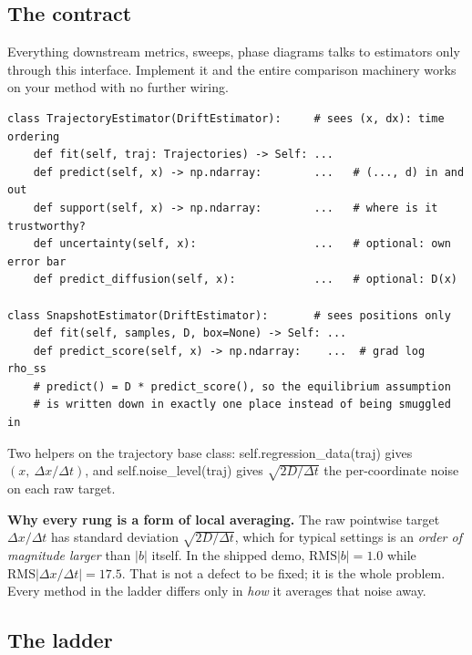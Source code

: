 \documentclass[11pt,a4paper]{article}
\newcommand{\code}[1]{{\ttfamily\small #1}}
\begin{document}
\subsection{The contract}

Everything downstream \textemdash{} metrics, sweeps, phase diagrams \textemdash{} talks
to estimators only through this interface. Implement it and the entire comparison
machinery works on your method with no further wiring.

\begin{codebox}
\begin{lstlisting}
class TrajectoryEstimator(DriftEstimator):     # sees (x, dx): time ordering
    def fit(self, traj: Trajectories) -> Self: ...
    def predict(self, x) -> np.ndarray:        ...   # (..., d) in and out
    def support(self, x) -> np.ndarray:        ...   # where is it trustworthy?
    def uncertainty(self, x):                  ...   # optional: own error bar
    def predict_diffusion(self, x):            ...   # optional: D(x)

class SnapshotEstimator(DriftEstimator):       # sees positions only
    def fit(self, samples, D, box=None) -> Self: ...
    def predict_score(self, x) -> np.ndarray:    ...  # grad log rho_ss
    # predict() = D * predict_score(), so the equilibrium assumption
    # is written down in exactly one place instead of being smuggled in
\end{lstlisting}
\end{codebox}

Two helpers on the trajectory base class:
\code{self.regression\_data(traj)} gives $(x,\ \Delta x/\Delta t)$, and
\code{self.noise\_level(traj)} gives $\sqrt{2D/\Delta t}$ \textemdash{} the
per-coordinate noise on each raw target.

\begin{keybox}
\textbf{Why every rung is a form of local averaging.} The raw pointwise target
$\Delta x/\Delta t$ has standard deviation $\sqrt{2D/\Delta t}$, which for typical
settings is an \emph{order of magnitude larger} than $|b|$ itself. In the shipped demo,
$\mathrm{RMS}|b| = 1.0$ while $\mathrm{RMS}|\Delta x/\Delta t| = 17.5$. That is not a
defect to be fixed; it is the whole problem. Every method in the ladder differs only in
\emph{how} it averages that noise away.
\end{keybox}

\subsection{The ladder}
\end{document}
